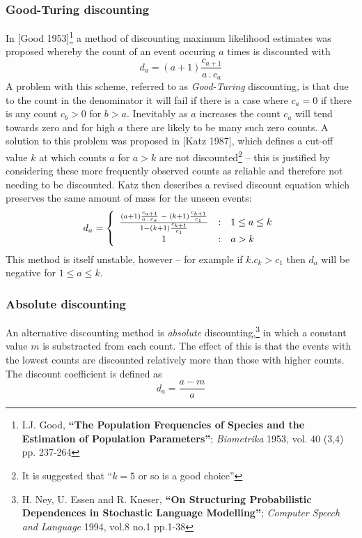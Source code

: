 \subsubsection{Good-Turing discounting}
In [Good 1953]\footnote{I.J. Good, \textbf{``The Population Frequencies
of Species and the Estimation of Population Parameters''};
\textit{Biometrika} 1953, vol. 40 (3,4) pp. 237-264}
a method of discounting maximum likelihood estimates was proposed
whereby the count of an event occuring $a$ times is discounted with
\begin{equation}
d_a = (a+1) \frac{c_{a+1}}{a\,.\,c_a}
\end{equation}
A problem with this scheme, referred to as {\it Good-Turing} discounting,
is that due to the count in the denominator it will fail if there is a
case where $c_a = 0$ if there is any count $c_b > 0$ for
$b>a$. Inevitably as $a$ increases the count $c_a$ will tend towards
zero and for high $a$ there are likely to be many such zero counts. A
solution to this problem was proposed in
[Katz 1987], which defines a cut-off value $k$ at which counts $a$
for $a > k$ are not discounted\footnote{It is suggested that ``$k=5$
or so is a good choice''} -- this is justified by
considering these more frequently observed counts as reliable and
therefore not needing to be discounted. Katz then describes a revised
discount equation which preserves the same amount of mass for the
unseen events:
\begin{equation}
d_a = \left\{ \begin{array}{c@{\quad:\quad}l}
  \frac{(a+1) \frac{c_{a+1}}{a\,.\,c_a} \;-\; (k+1)\frac{c_{k+1}}{c_1}}
      {1 - (k+1)\frac{c_{k+1}}{c_1}}
  & 1 \le a \le k\\
1 & a>k
\end{array}\right.
\end{equation}
This method is itself unstable, however -- for example if $k.c_k > c_1$
then $d_a$ will be negative for $1 \le a \le k$.

\subsubsection{Absolute discounting}
An alternative discounting method is {\it absolute}
discounting,\footnote{H. Ney, U. Essen and R. Kneser, \textbf{``On
Structuring Probabilistic Dependences in Stochastic Language
Modelling''}; \textit{Computer Speech and Language} 1994, vol.8 no.1
pp.1-38} in which a constant value $m$ is substracted from each
count. The effect of this is that the events with the lowest counts
are discounted relatively more than those with higher counts. The
discount coefficient is defined as
\begin{equation}
d_a = \frac{a-m}{a}
\end{equation}

